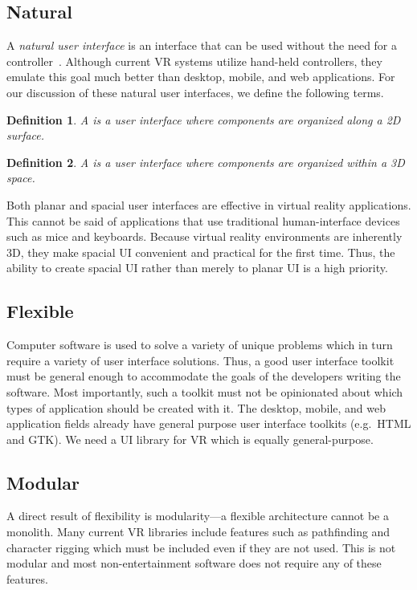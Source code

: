 \documentclass[conference,12pt]{IEEEtran}
\newtheorem{definition}{Definition}
\begin{document}
\subsection{Natural}\label{sec:natural}
A \textit{natural user interface} is an interface that can be used without the
need for a controller~\cite{Wimmers:2015:VR:Natural-UI}. Although current VR
systems utilize hand-held controllers, they emulate this goal much better than
desktop, mobile, and web applications. For our discussion of these natural user
interfaces, we define the following terms.

\begin{definition}\label{def:planar-ui}
    A {\normalfont{}} is a user interface where components are
    organized along a 2D surface.
\end{definition}

\begin{definition}\label{def:spacial-ui}
    A {\normalfont{}} is a user interface where components are
    organized within a 3D space.
\end{definition}

Both planar and spacial user interfaces are effective in virtual reality
applications. This cannot be said of applications that use traditional
human-interface devices such as mice and keyboards. Because virtual reality
environments are inherently 3D, they make spacial UI convenient and practical
for the first time. Thus, the ability to create spacial UI rather than merely to
planar UI is a high priority.

\subsection{Flexible}\label{sec:flexible}
Computer software is used to solve a variety of unique problems which in turn
require a variety of user interface solutions. Thus, a good user interface
toolkit must be general enough to accommodate the goals of the developers
writing the software. Most importantly, such a toolkit must not be opinionated
about which types of application should be created with it. The desktop, mobile,
and web application fields already have general purpose user interface toolkits
(e.g.\ HTML and GTK). We need a UI library for VR which is equally
general-purpose.

\subsection{Modular}\label{sec:modular}
A direct result of flexibility is modularity---a flexible architecture cannot be
a monolith. Many current VR libraries include features such as pathfinding and
character rigging which must be included even if they are not used. This is not
modular and most non-entertainment software does not require any of these
features.
\end{document}
